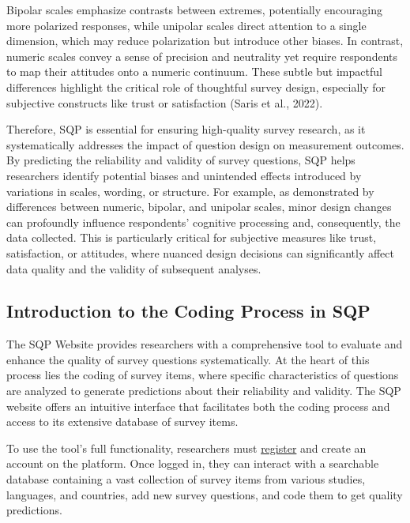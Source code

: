 \documentclass[
  letterpaper,
  DIV=11,
  numbers=noendperiod]{scrartcl}
\begin{document}
Bipolar scales emphasize contrasts between extremes, potentially
encouraging more polarized responses, while unipolar scales direct
attention to a single dimension, which may reduce polarization but
introduce other biases. In contrast, numeric scales convey a sense of
precision and neutrality yet require respondents to map their attitudes
onto a numeric continuum. These subtle but impactful differences
highlight the critical role of thoughtful survey design, especially for
subjective constructs like trust or satisfaction (Saris et al., 2022).

Therefore, SQP is essential for ensuring high-quality survey research,
as it systematically addresses the impact of question design on
measurement outcomes. By predicting the reliability and validity of
survey questions, SQP helps researchers identify potential biases and
unintended effects introduced by variations in scales, wording, or
structure. For example, as demonstrated by differences between numeric,
bipolar, and unipolar scales, minor design changes can profoundly
influence respondents' cognitive processing and, consequently, the data
collected. This is particularly critical for subjective measures like
trust, satisfaction, or attitudes, where nuanced design decisions can
significantly affect data quality and the validity of subsequent
analyses.

\subsection{Introduction to the Coding Process in
SQP}\label{introduction-to-the-coding-process-in-sqp}

The SQP Website provides researchers with a comprehensive tool to
evaluate and enhance the quality of survey questions systematically. At
the heart of this process lies the coding of survey items, where
specific characteristics of questions are analyzed to generate
predictions about their reliability and validity. The SQP website offers
an intuitive interface that facilitates both the coding process and
access to its extensive database of survey items.

To use the tool's full functionality, researchers must
\href{https://sqp.gesis.org/signin}{register} and create an account on
the platform. Once logged in, they can interact with a searchable
database containing a vast collection of survey items from various
studies, languages, and countries, add new survey questions, and code
them to get quality predictions.
\end{document}
